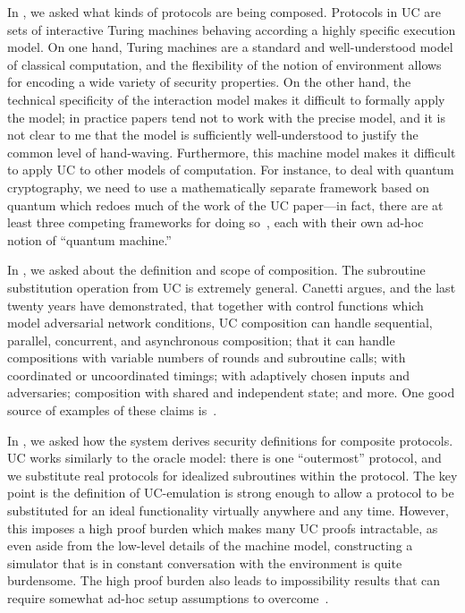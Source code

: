 In , we asked what kinds of protocols are
being composed. Protocols in UC are sets of interactive Turing machines behaving
according a highly specific execution model. On one hand, Turing machines are a
standard and well-understood model of classical computation, and the flexibility
of the notion of environment allows for encoding a wide variety of security
properties. On the other hand, the technical specificity of the interaction
model makes it difficult to formally apply the model; in practice papers tend
not to work with the precise model, and it is not clear to me that the model is
sufficiently well-understood to justify the common level of hand-waving.
Furthermore, this machine model makes it difficult to apply UC to other models
of computation. For instance, to deal with quantum cryptography, we need to use
a mathematically separate framework based on quantum which redoes much of the
work of the UC paper---in fact, there are at least three competing frameworks
for doing so~\cite{unruh-2004,benor-2004,unruh-2010}, each with their own ad-hoc
notion of ``quantum machine.''

In , we
asked about the definition and scope of composition. The subroutine substitution
operation from UC is extremely general. Canetti argues, and the last twenty
years have demonstrated, that together with control functions which model
adversarial network conditions, UC composition can handle sequential, parallel,
concurrent, and asynchronous composition; that it can handle compositions with
variable numbers of rounds and subroutine calls; with coordinated or
uncoordinated timings; with adaptively chosen inputs and adversaries;
composition with shared and independent state; and more. One good source of
examples of these claims is~\cite{canetti-2006}.

In , we asked how the system derives
security definitions for composite protocols. UC works similarly to the oracle
model: there is one ``outermost'' protocol, and we substitute real protocols for
idealized subroutines within the protocol. The key point is the definition of
UC-emulation is strong enough to allow a protocol to be substituted for an ideal
functionality virtually anywhere and any time. However, this imposes a high
proof burden which makes many UC proofs intractable, as even aside from the
low-level details of the machine model, constructing a simulator that is
in constant conversation with the environment is quite burdensome. The high
proof burden also leads to impossibility results that can require somewhat ad-hoc
setup assumptions to
overcome~\cite{canetti-fischlin-2001,barak-et-al-2004,kidron-lindell-2007,jost-2020}.

